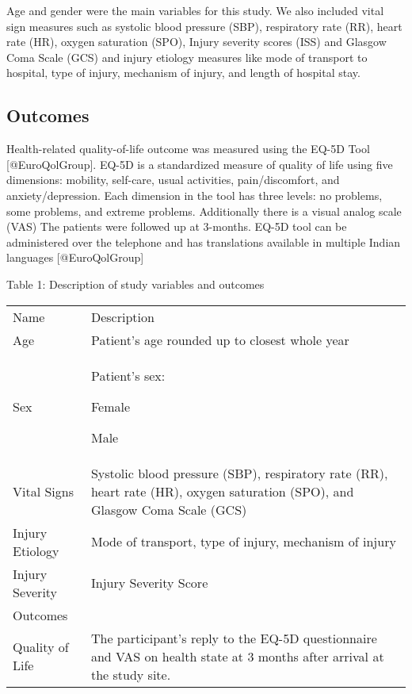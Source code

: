 \documentclass[
]{article}
\begin{document}
Age and gender were the main variables for this study. We also included
vital sign measures such as systolic blood pressure (SBP), respiratory
rate (RR), heart rate (HR), oxygen saturation (SPO), Injury severity
scores (ISS) and Glasgow Coma Scale (GCS) and injury etiology measures
like mode of transport to hospital, type of injury, mechanism of injury,
and length of hospital stay.

\hypertarget{outcomes}{%
\subsection{Outcomes}\label{outcomes}}

Health-related quality-of-life outcome was measured using the EQ-5D Tool
{[}@EuroQolGroup{]}. EQ-5D is a standardized measure of quality of life
using five dimensions: mobility, self-care, usual activities,
pain/discomfort, and anxiety/depression. Each dimension in the tool has
three levels: no problems, some problems, and extreme problems.
Additionally there is a visual analog scale (VAS) The patients were
followed up at 3-months. EQ-5D tool can be administered over the
telephone and has translations available in multiple Indian languages
{[}@EuroQolGroup{]}

Table 1: Description of study variables and outcomes

\begin{longtable}[]{@{}
  >{\raggedright\arraybackslash}p{}
  >{\raggedright\arraybackslash}p{}@{}}
\toprule
\endhead
Name & Description \\
Age & Patient's age rounded up to closest whole year \\
Sex & Patient's sex:

Female

Male \\
Vital Signs & Systolic blood pressure (SBP), respiratory rate (RR),
heart rate (HR), oxygen saturation (SPO), and Glasgow Coma Scale
(GCS) \\
Injury Etiology & Mode of transport, type of injury, mechanism of
injury \\
Injury Severity & Injury Severity Score \\
Outcomes & \\
Quality of Life & The participant's reply to the EQ-5D questionnaire and
VAS on health state at 3 months after arrival at the study site. \\
\bottomrule
\end{longtable}
\end{document}
